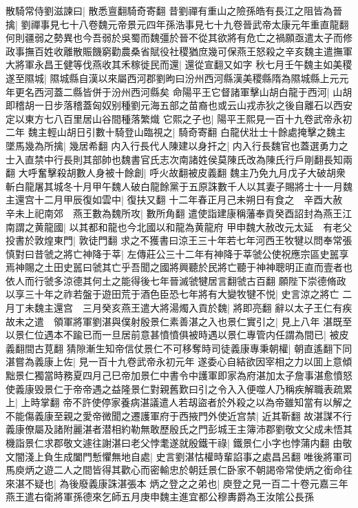 散騎常侍劉滋諫曰|{
	散悉亶翻騎奇寄翻}
昔劉禪有重山之險孫皓有長江之阻皆為晉擒|{
	劉禪事見七十八卷魏元帝景元四年孫浩事見七十九卷晉武帝太康元年重直龍翻}
何則疆弱之勢異也今吾弱於吳蜀而魏彊於晉不從其欲將有危亡之禍願亟遣太子而修政事撫百姓收離散賑饑窮勸農桑省賦役社稷猶庶幾可保燕王怒殺之辛亥魏主遣撫軍大將軍永昌王健等伐燕收其禾稼徙民而還|{
	還從宣翻又如字}
秋七月壬午魏主如美稷遂至隰城|{
	隰城縣自漢以來屬西河郡劉昫曰汾州西河縣漢美稷縣隋為隰城縣上元元年更名西河蓋二縣皆併于汾州西河縣矣}
命陽平王它督諸軍擊山胡白龍于西河|{
	山胡即稽胡一日步落稽蓋匈奴别種劉元海五部之苗裔也或云山戎赤狄之後自離石以西安定以東方七八百里居山谷間種落繁熾}
它熙之子也|{
	陽平王熙見一百十九卷武帝永初二年}
魏主輕山胡日引數十騎登山臨視之|{
	騎奇寄翻}
白龍伏壯士十餘處掩擊之魏主墜馬幾為所擒|{
	幾居希翻}
内入行長代人陳建以身扞之|{
	内入行長魏官也蓋選勇力之士入直禁中行長則其部帥也魏書官氏志次南諸姓侯莫陳氏改為陳氏行戶剛翻長知兩翻}
大呼奮擊殺胡數人身被十餘創|{
	呼火故翻被皮義翻}
魏主乃免九月戊子大破胡衆斬白龍屠其城冬十月甲午魏人破白龍餘黨于五原誅數千人以其妻子賜將士十一月魏主還宫十二月甲辰復如雲中|{
	復扶又翻}
十二年春正月己未朔日有食之　辛酉大赦　辛未上祀南郊　燕王數為魏所攻|{
	數所角翻}
遣使詣建康稱藩奉貢癸酉詔封為燕王江南謂之黄龍國|{
	以其都和龍也今北國以和龍為黄龍府}
甲申魏大赦改元太延　有老父投書於敦煌東門|{
	敦徒門翻}
求之不獲書曰涼王三十年若七年河西王牧犍以問奉常張慎對曰昔虢之將亡神降于莘|{
	左傳莊公三十二年有神降于莘虢公使祝應宗區史嚚享焉神賜之土田史嚚曰虢其亡乎吾聞之國將興聽於民將亡聽于神神聰明正直而壹者也依人而行虢多涼德其何土之能得後七年晉滅虢犍居言翻虢古百翻}
願陛下崇德脩政以享三十年之祚若盤于遊田荒于酒色臣恐七年將有大變牧犍不悦|{
	史言涼之將亡}
二月丁未魏主還宫　三月癸亥燕王遣大將湯燭入貢於魏|{
	將即亮翻}
辭以太子王仁有疾故未之遣　領軍將軍劉湛與僕射殷景仁素善湛之入也景仁實引之|{
	見上八年}
湛既至以景仁位遇本不踰已而一旦居前意甚憤憤俱被時遇以景仁專管内任謂為間已|{
	被皮義翻間古莧翻}
猜隙漸生知帝信仗景仁不可移奪時司徒義康專秉朝權|{
	朝直遙翻下同}
湛嘗為義康上佐|{
	見一百十九卷武帝永初元年}
遂委心自結欲因宰相之力以囬上意傾黜景仁獨當時務夏四月己巳帝加景仁中書令中護軍即家為府湛加太子詹事湛愈憤怒使義康毁景仁于帝帝遇之益隆景仁對親舊歎曰引之令入入便噬人乃稱疾解職表疏累上|{
	上時掌翻}
帝不許使停家養病湛議遣人若刼盜者於外殺之以為帝雖知當有以解之不能傷義康至親之愛帝微聞之遷護軍府于西掖門外使近宫禁|{
	近其靳翻}
故湛謀不行義康僚屬及諸附麗湛者潜相約勒無敢歷殷氏之門彭城王主簿沛郡劉敬文父成未悟其機詣景仁求郡敬文遽往謝湛曰老父悖耄遂就殷鐵干祿|{
	鐵景仁小字也悖蒲内翻}
由敬文闇淺上負生成闔門慙懼無地自處|{
	史言劉湛怙權時輩諂事之處昌呂翻}
唯後將軍司馬庾炳之遊二人之間皆得其歡心而密輸忠於朝廷景仁卧家不朝謁帝常使炳之銜命往來湛不疑也|{
	為後廢義康誅湛張本}
炳之登之之弟也|{
	庾登之見一百二十卷元嘉三年}
燕王遣右衛將軍孫德來乞師五月庚申魏主進宜都公穆夀爵為王汝隂公長孫


